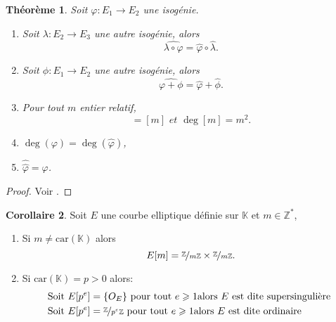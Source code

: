 \documentclass[10pt,a4paper]{book}
\theoremstyle{plain}
\newtheorem{thm}{Théorème}
\theoremstyle{definition}
\theoremstyle{definition}
\newtheorem{cor}[thm]{Corollaire}
\theoremstyle{definition}
\theoremstyle{definition}
\theoremstyle{remark}
\theoremstyle{remark}
\begin{document}
\begin{thm}
Soit $\varphi:E_1 \rightarrow E_2$ une isogénie.
\begin{enumerate}
\item Soit $\lambda:E_2 \rightarrow E_3$ une autre isogénie, alors
\begin{equation*}
\widehat{\lambda \circ \varphi}= \widehat{\varphi} \circ \widehat{\lambda}.
\end{equation*} 
\item Soit $\phi:E_1 \rightarrow E_2$ une autre isogénie, alors
\begin{equation*}
\widehat{\varphi+\phi}=\widehat{\varphi}+\widehat{\phi}.
\end{equation*}
\item Pour tout $m$ entier relatif,
\begin{equation*}
[\widehat{m}]=[m] \textit{ et } \deg[m]=m^2.
\end{equation*}
\item $\deg( \varphi)=\deg(\widehat{\varphi})$,
\item $\widehat{\widehat{\varphi}}=\varphi$.
\end{enumerate}
 
\end{thm}

\begin{proof}
Voir \cite[Theorem III.6.2]{Silv1}.
\end{proof}

\begin{cor}
Soit $E$ une courbe elliptique définie sur $\mathbb{K}$ et $m \in \mathbb{Z}^*$,
\begin{enumerate}
\item Si $m \neq \mathrm{car}(\mathbb{K})$ alors
\begin{equation*}
E[m]=\nicefrac{\mathbb{Z}}{m\mathbb{Z}} \times \nicefrac{\mathbb{Z}}{m\mathbb{Z}}. 
\end{equation*}
\item Si $\mathrm{car}(\mathbb{K})=p>0$ alors:
\begin{equation*}
\begin{alignedat}{1}
&\text{Soit } E[p^e]=\{O_E\} \text{ pour tout } e \geqslant 1 \text{alors $E$ est dite supersingulière }\\
&\text{Soit } E[p^e]=\nicefrac{\mathbb{Z}}{p^e\mathbb{Z}} \text{ pour tout } e \geqslant 1
\text{alors $E$ est dite ordinaire }\end{alignedat}
\end{equation*}
\end{enumerate}
\end{cor}
\end{document}
